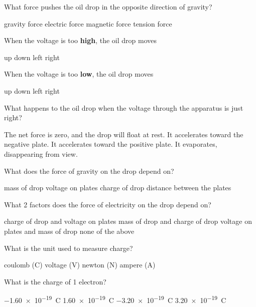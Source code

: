 \documentclass[../main-physics-problems.tex]{subfiles}
\begin{document}
\begin{questions}
\question
What force pushes the oil drop in the opposite direction of gravity?

\begin{randomizechoices}
    \choice gravity force
    \correctchoice electric force
    \choice magnetic force
    \choice tension force
\end{randomizechoices}

\question
When the voltage is too \textbf{high}, the oil drop moves

\begin{randomizechoices}
    \correctchoice up
    \choice down
    \choice left
    \choice right
\end{randomizechoices}

\question
When the voltage is too \textbf{low}, the oil drop moves

\begin{randomizechoices}
    \choice up
    \correctchoice down
    \choice left
    \choice right
\end{randomizechoices}

\question
What happens to the oil drop when the voltage through the apparatus is just right?

\begin{randomizechoices}
    \correctchoice The net force is zero, and the drop will float at rest.
    \choice It accelerates toward the negative plate.
    \choice It accelerates toward the positive plate.
    \choice It evaporates, disappearing from view.
\end{randomizechoices}

\question
What does the force of gravity on the drop depend on?

\begin{randomizechoices}
    \correctchoice mass of drop
    \choice voltage on plates
    \choice charge of drop
    \choice distance between the plates
\end{randomizechoices}

\question
What 2 factors does the force of electricity on the drop depend on?

\begin{randomizechoices}[keeplast]
    \correctchoice charge of drop and voltage on plates
    \choice mass of drop and charge of drop
    \choice voltage on plates and mass of drop
    \choice none of the above
\end{randomizechoices}

\question 
What is the unit used to measure charge?

\begin{randomizechoices}
    \correctchoice coulomb (C)
    \choice voltage (V)
    \choice newton (N)
    \choice ampere (A)
\end{randomizechoices}

\question
What is the charge of 1 electron?

\begin{randomizechoices}
    \correctchoice \SI{-1.60e-19}{C}
    \choice \SI{1.60e-19}{C}
    \choice \SI{-3.20e-19}{C}
    \choice \SI{3.20e-19}{C}
\end{randomizechoices}

\end{questions}
\end{document}
